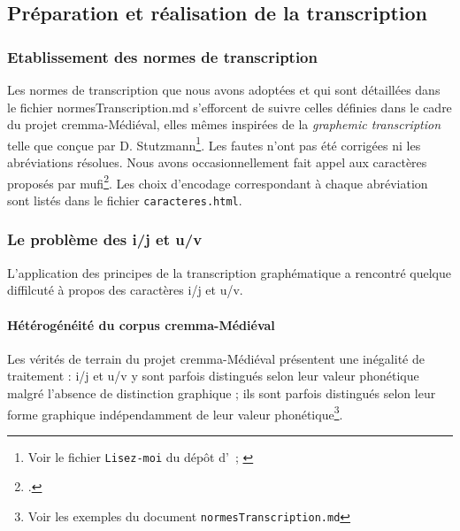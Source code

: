 \documentclass{article}
\newcommand\textvtt[1]{{\normalfont\fontfamily{cmvtt}\selectfont #1}}
\begin{document}
\subsection{Préparation et réalisation de la transcription}
\subsubsection{Etablissement des normes de transcription}
Les normes de transcription que nous avons adoptées et qui sont détaillées dans le fichier \textvtt{normesTranscription.md} s'efforcent de suivre celles définies dans le cadre du projet \gls{cremma}-Médiéval, elles mêmes inspirées de la \textit{graphemic transcription} telle que conçue par D. Stutzmann\footnote{Voir le fichier \texttt{Lisez-moi} du dépôt d'\cite{pincheCREMMAMedievalOld2021}~; \cite{stutzmannPaleographieStatistiquePour2011}}. Les fautes n'ont pas été corrigées ni les abréviations résolues. Nous avons occasionnellement fait appel aux caractères proposés par \gls{mufi}\footcite{MedievalUnicodeFont2016}. Les choix d'encodage correspondant à chaque abréviation sont listés dans le fichier \texttt{caracteres.html}.

\subsubsection{Le problème des i/j et u/v}
L'application des principes de la transcription graphématique a rencontré quelque diffilcuté à propos des caractères i/j et u/v. 
\paragraph{Hétérogénéité du corpus \gls{cremma}-Médiéval}
Les vérités de terrain du projet \gls{cremma}-Médiéval présentent une inégalité de traitement : i/j et u/v y sont parfois distingués selon leur valeur phonétique malgré l'absence de distinction graphique ; ils sont parfois distingués selon leur forme graphique indépendamment de leur valeur phonétique\footnote{Voir les exemples du document \texttt{normesTranscription.md}}.
\end{document}
